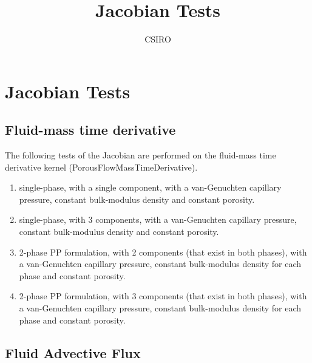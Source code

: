 \documentclass[]{scrreprt}
\begin{document}
\title{Jacobian Tests}
\author{CSIRO}
\maketitle

\tableofcontents

\chapter{Jacobian Tests}

\section{Fluid-mass time derivative}

The following tests of the Jacobian are performed on the fluid-mass time derivative kernel (PorousFlowMassTimeDerivative).
\begin{enumerate}
\item single-phase, with a single component, with a van-Genuchten capillary pressure, constant bulk-modulus density and constant porosity.
\item single-phase, with 3 components, with a van-Genuchten capillary pressure, constant bulk-modulus density and constant porosity.
\item 2-phase PP formulation, with 2 components (that exist in both phases), with a van-Genuchten capillary pressure, constant bulk-modulus density for each phase and constant porosity.
\item 2-phase PP formulation, with 3 components (that exist in both phases), with a van-Genuchten capillary pressure, constant bulk-modulus density for each phase and constant porosity.
\end{enumerate}


\section{Fluid Advective Flux}
\end{document}
